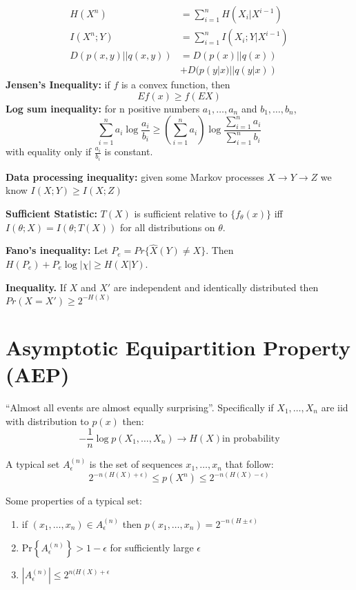 \documentclass[10pt]{article}
\begin{document}
\begin{scriptsize}
\begin{multicols}{3}
\begin{align}
H(X^n)&=\sum_{i=1}^n H(X_i|X^{i-1})\\
I(X^n;Y)&=\sum_{i=1}^n I(X_i;Y|X^{i-1})\\
D(p(x,y)||q(x,y))&=D(p(x)||q(x))\\
&+D(p(y|x)||q(y|x))
\end{align}
{\bf Jensen's Inequality:} if $f$ is a convex function, then
\begin{equation}
Ef(x) \geq f(EX)
\end{equation}
{\bf Log sum inequality:} for n positive numbers $a_1,\ldots,a_n$ and $b_1,\ldots,b_n$,
\begin{equation}
\sum_{i=1}^n a_i \log \frac{a_i}{b_i} \geq \left( \sum_{i=1}^n a_i \right) \log \frac{\sum_{i=1}^n a_i}{\sum_{i=1}^n b_i}
\end{equation}
with equality only if $\frac{a_i}{b_i}$ is constant. 

{\bf Data processing inequality:} given some Markov processes $X\rightarrow Y\rightarrow Z$ we know $I(X;Y)\geq I(X;Z)$

{\bf Sufficient Statistic:} $T(X)$ is sufficient relative to $\{f_\theta (x)\}$ iff $I(\theta;X)=I(\theta;T(X))$ for all distributions on $\theta$.

{\bf Fano's inequality:} Let $P_e=Pr\{\hat{X}(Y)\neq X\}$. Then $H(P_e)+P_e \log |\chi| \geq H(X|Y)$.

{\bf Inequality.} If $X$ and $X'$ are independent and identically distributed then $Pr(X=X') \geq 2^{-H(X)}$


\section*{Asymptotic Equipartition Property (AEP)}
``Almost all events are almost equally surprising''. Specifically if $X_1,\ldots,X_n$ are iid with distribution to $p(x)$ then:
\begin{equation}
-\frac{1}{n}\log p(X_1,\ldots,X_n)\rightarrow H(X) \text{in probability}
\label{thm: AEP}
\end{equation}

A typical set $A_\epsilon^{(n)}$ is the set of sequences $x_1,\ldots, x_n$ that follow:
\begin{equation}
2^{-n(H(X)+\epsilon)}\leq p(X^n)\leq 2^{-n(H(X)-\epsilon)}
\label{defn: typical set}
\end{equation}

Some properties of a typical set:
\begin{enumerate}
\item if $(x_1,\ldots,x_n) \in A_\epsilon^{(n)}$ then $p(x_1,\ldots,x_n) = 2^{-n(H\pm \epsilon)}$
\item Pr$\left\{A_\epsilon^{(n)}\right\}>1-\epsilon$ for sufficiently large $\epsilon$
\item $|A_\epsilon^{(n)}| \leq 2^{n(H(X)+\epsilon}$
\end{enumerate}


\end{multicols}
\end{scriptsize}
\end{document}
